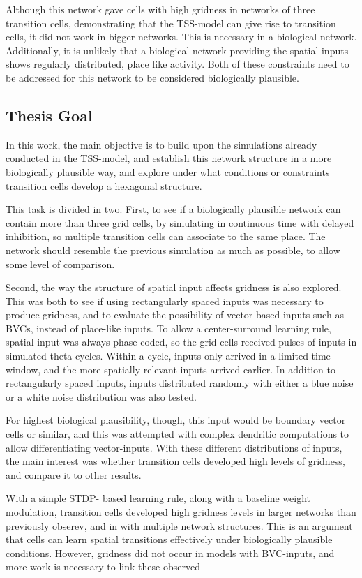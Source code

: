 \documentclass{article}
\begin{document}
    Although this network gave cells with high gridness in networks of three transition cells, demonstrating that the TSS-model can give rise to transition cells, it did not work in bigger networks. This is necessary in a biological network. Additionally, it is unlikely that a biological network providing the spatial inputs shows regularly distributed, place like activity. Both of these constraints need to be addressed for this network to be considered biologically plausible.

    \subsection{Thesis Goal}
    In this work, the main objective is to build upon the simulations already conducted in the TSS-model, and establish this network structure in a more biologically plausible way, and explore under what conditions or constraints transition cells develop a hexagonal structure.

    This task is divided in two. First, to see if a biologically plausible network can contain more than three grid cells, by simulating in continuous time with delayed inhibition, so multiple transition cells can associate to the same place. The network should resemble the previous simulation as much as possible, to allow some level of comparison.

    Second, the way the structure of spatial input affects gridness is also explored. This was both to see if using rectangularly spaced inputs was necessary to produce gridness, and to evaluate the possibility of vector-based inputs such as BVCs, instead of place-like inputs. To allow a center-surround learning rule, spatial input was always phase-coded, so the grid cells received pulses of inputs in simulated theta-cycles. Within a cycle, inputs only arrived in a limited time window, and the more spatially relevant inputs arrived earlier. In addition to rectangularly spaced inputs, inputs distributed randomly with either a blue noise or a white noise distribution was also tested.

    For highest biological plausibility, though, this input would be boundary vector cells or similar, and this was attempted with complex dendritic computations to allow differentiating vector-inputs. With these different distributions of inputs, the main interest was whether transition cells developed high levels of gridness, and compare it to other results.

    With a simple STDP- based learning rule, along with a baseline weight modulation, transition cells developed high gridness levels in larger networks than previously obserev, and in with multiple network structures. This is an argument that cells can learn spatial transitions effectively under biologically plausible conditions. However, gridness did not occur in models with BVC-inputs, and more work is necessary to link these observed
        
\end{document}
